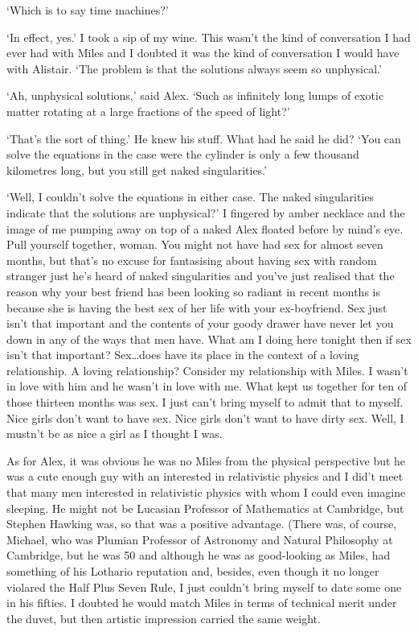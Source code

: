 `Which is to say time machines?'

`In effect, yes.' I took a sip of my wine. This wasn't the kind of
conversation I had ever had with Miles and I doubted it was the kind of conversation I would have with Alistair. `The problem is that the solutions always seem so unphysical.'

`Ah, unphysical solutions,' said Alex. `Such as infinitely long lumps of exotic matter rotating at a large
fractions of the speed of light?'

`That's the sort of thing.' He knew his stuff. What had he said he did? `You can solve the equations in
the case were the cylinder is only a few thousand kilometres long, but you still get naked singularities.'

`Well, I couldn't solve the equations in either case. The naked
singularities indicate that the solutions are unphysical?' I fingered by amber necklace and the image of me pumping away on top of a naked Alex floated before by mind's eye. Pull yourself together, woman. You might not have had sex for almost seven months, but that's no excuse for fantasising about having sex with random stranger just he's heard of naked singularities and you've just realised that the reason why your best friend has been looking so radiant in recent months is because she is having the best sex of her life with your ex-boyfriend. Sex just isn't that important and the contents of your goody drawer have never let you down in any of the ways that men have. What am I doing here tonight then if sex isn't that important? Sex\dots does have its place in the context of a loving relationship. A loving
relationship? Consider my relationship with Miles. I wasn't in love with him and he wasn't in love with me. What kept us together for ten of those thirteen months was sex. I just can't bring myself to admit that to myself. Nice girls don't
want to have sex. Nice girls don't want to have {\twelveit dirty\/} sex. Well, I mustn't be as nice a girl as I thought I was.

As for Alex, it was obvious he was no Miles from the physical perspective  but he was a cute enough guy with an interested in relativistic
physics and I did't meet that many men interested in relativistic
physics with whom I could even imagine sleeping. He might not be Lucasian Professor of Mathematics
at Cambridge, but Stephen Hawking was, so that was a positive advantage. (There was, of course, Michael, who was Plumian Professor of Astronomy and Natural Philosophy at Cambridge, but he was 50 and although he was as good-looking as Miles, had something of his Lothario reputation and, besides, even though it no longer violared the Half Plus Seven Rule, I just couldn't bring myself to date some one in his {\twelveit fifties}. I doubted he would match Miles in terms of technical merit under the duvet, but then artistic impression carried the same weight.


